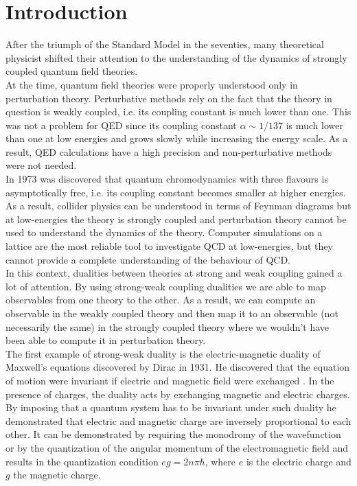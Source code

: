 
\chapter{Introduction}

After the triumph of the Standard Model in the seventies, many theoretical physicist shifted their attention to the understanding of the dynamics of strongly coupled quantum field theories. \\
At the time, quantum field theories were properly understood only in perturbation theory. 
Perturbative methods rely on the fact that the theory in question is weakly coupled, i.e. its coupling constant is much lower than one. This was not a problem for QED since its coupling constant $\alpha \sim 1/137$ is much lower than one at low energies and grows slowly while increasing the energy scale.
As a result, QED calculations have a high precision and non-perturbative methods were not needed.\\
In 1973 was discovered that quantum chromodynamics with three flavours is asymptotically free, i.e. its coupling constant becomes smaller at higher energies. 
As a result, collider physics can be understood in terms of Feynman diagrams but at low-energies the theory is strongly coupled and perturbation theory cannot be used to understand the dynamics of the theory.
Computer simulations on a lattice are the most reliable tool to investigate QCD at low-energies, but they cannot provide a complete understanding of the behaviour of QCD.\\ 
In this context, dualities between theories at strong and weak coupling gained a lot of attention. 
By using strong-weak coupling dualities we are able to map observables from one theory to the other.
As a result, we can compute an observable in the weakly coupled theory and then map it to an observable (not necessarily the same) in the strongly coupled theory where we wouldn't have been able to compute it in perturbation theory.  \\
The first example of strong-weak duality is the electric-magnetic duality of Maxwell's equations discovered by Dirac in 1931.  
He discovered that the equation of motion were invariant if electric and magnetic field were exchanged . 
In the presence of charges, the duality acts by exchanging magnetic and electric charges. 
By imposing that a quantum system has to be invariant under such duality he demonstrated that electric and magnetic charge are inversely proportional to each other. 
It can be demonstrated by requiring the monodromy of the wavefunction or by the quantization of the angular momentum of the electromagnetic field and results in the quantization condition $e g =  2 n \pi \hbar$, where $e$ is the electric charge and $g$ the magnetic charge.\\
